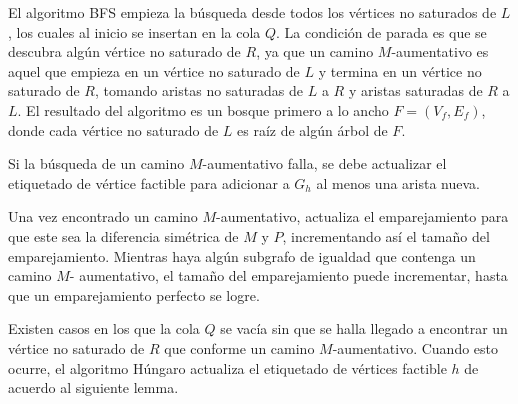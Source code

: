 \documentclass[10pt]{article} %
\begin{document}
	El algoritmo BFS empieza la b\'usqueda desde todos los v\'ertices no saturados de $L$, los cuales al inicio se insertan en la cola $Q$. La condici\'on de parada es que se descubra alg\'un v\'ertice no saturado de $R$, ya que un camino $M$-aumentativo es aquel que empieza en un v\'ertice no saturado de $L$ y termina en un v\'ertice no saturado de $R$, tomando aristas no saturadas de $L$ a $R$ y aristas saturadas de $R$ a $L$. El resultado del algoritmo es un bosque primero a lo ancho $F = (V_f, E_f)$, donde cada v\'ertice no saturado de $L$ es ra\'iz de alg\'un \'arbol de $F$.
	
	
	Si la b\'usqueda de un camino $M$-aumentativo falla, se debe actualizar el etiquetado de v\'ertice factible para adicionar a $G_h$ al menos una arista nueva.
	
	Una vez encontrado un camino $M$-aumentativo, actualiza el emparejamiento para que este sea la diferencia sim\'etrica de $M$ y $P$, incrementando as\'i el tama\~no del emparejamiento.  Mientras haya alg\'un subgrafo de igualdad que contenga un camino $M$- aumentativo, el tama\~no del emparejamiento puede incrementar, hasta que un emparejamiento perfecto se logre.
	
	Existen casos en los que la cola $Q$ se vac\'ia sin que se halla llegado a encontrar un v\'ertice no saturado de $R$ que conforme un camino $M$-aumentativo. Cuando esto ocurre, el algoritmo H\'ungaro actualiza el etiquetado de v\'ertices factible $h$ de acuerdo al siguiente lemma.
	
\end{document}
